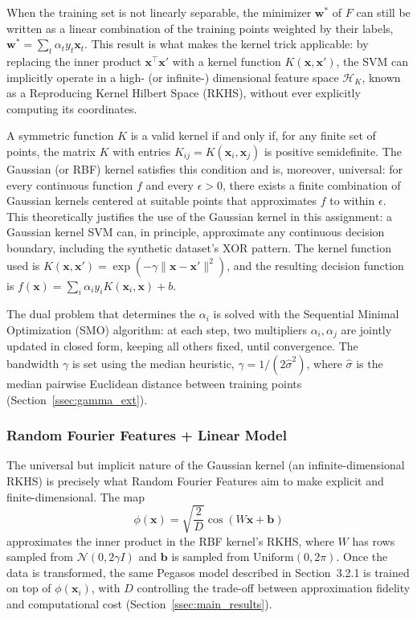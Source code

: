 \documentclass{article}
\begin{document}
When the training set is not linearly separable, the minimizer $\mathbf{w}^*$ of $F$ can still be written as a linear combination of the training points weighted by their labels, $\mathbf{w}^* = \sum_t \alpha_t y_t \mathbf{x}_t$. This result is what makes the kernel trick applicable: by replacing the inner product $\mathbf{x}^\top\mathbf{x}'$ with a kernel function $K(\mathbf{x}, \mathbf{x}')$, the SVM can implicitly operate in a high- (or infinite-) dimensional feature space $\mathcal{H}_K$, known as a Reproducing Kernel Hilbert Space (RKHS), without ever explicitly computing its coordinates.

A symmetric function $K$ is a valid kernel if and only if, for any finite set of points, the matrix $K$ with entries $K_{ij} = K(\mathbf{x}_i, \mathbf{x}_j)$ is positive semidefinite. The Gaussian (or RBF) kernel satisfies this condition and is, moreover, universal: for every continuous function $f$ and every $\epsilon>0$, there exists a finite combination of Gaussian kernels centered at suitable points that approximates $f$ to within $\epsilon$. This theoretically justifies the use of the Gaussian kernel in this assignment: a Gaussian kernel SVM can, in principle, approximate any continuous decision boundary, including the synthetic dataset's XOR pattern. The kernel function used is $K(\mathbf{x}, \mathbf{x}') = \exp(-\gamma\|\mathbf{x}-\mathbf{x}'\|^2)$, and the resulting decision function is $f(\mathbf{x}) = \sum_i \alpha_i y_i K(\mathbf{x}_i, \mathbf{x}) + b$.

The dual problem that determines the $\alpha_i$ is solved with the Sequential Minimal Optimization (SMO) algorithm: at each step, two multipliers $\alpha_i, \alpha_j$ are jointly updated in closed form, keeping all others fixed, until convergence. The bandwidth $\gamma$ is set using the median heuristic, $\gamma = 1/(2\hat\sigma^2)$, where $\hat\sigma$ is the median pairwise Euclidean distance between training points (Section~\ref{ssec:gamma_ext}).

\subsubsection{Random Fourier Features + Linear Model}
\label{sssec:rff}

The universal but implicit nature of the Gaussian kernel (an infinite-dimensional RKHS) is precisely what Random Fourier Features aim to make explicit and finite-dimensional. The map
\begin{equation}
    \phi(\mathbf{x}) = \sqrt{\frac{2}{D}}\cos(W\mathbf{x} + \mathbf{b})
\end{equation}
approximates the inner product in the RBF kernel's RKHS, where $W$ has rows sampled from $\mathcal{N}(0, 2\gamma I)$ and $\mathbf{b}$ is sampled from $\mathrm{Uniform}(0, 2\pi)$. Once the data is transformed, the same Pegasos model described in Section~3.2.1 is trained on top of $\phi(\mathbf{x}_i)$, with $D$ controlling the trade-off between approximation fidelity and computational cost (Section~\ref{ssec:main_results}).
\end{document}
